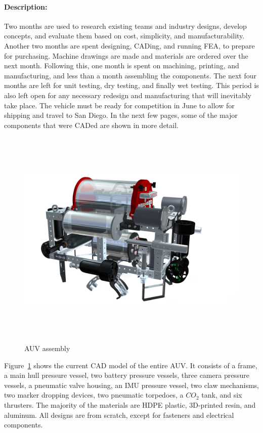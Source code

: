 \documentclass[12pt, landscape]{article}
\begin{document}
		\paragraph{Description:} Two months are used to research existing teams and industry designs, develop concepts, and evaluate them based on cost, simplicity, and manufacturability.  Another two months are spent designing, CADing, and running FEA, to prepare for purchasing.  Machine drawings are made and materials are ordered over the next month.  Following this, one month is spent on machining, printing, and manufacturing, and less than a month assembling the components.  The next four months are left for unit testing, dry testing, and finally wet testing.  This period is also left open for any necessary redesign and manufacturing that will inevitably take place.  The vehicle must be ready for competition in June to allow for shipping and travel to San Diego.
		In the next few pages, some of the major components that were CADed are shown in more detail.

	\begin{samepage}
		\begin{figure}[H]
			\centering
			\includegraphics[height=4.2in]{media/full_assembly.png}
			\caption{AUV assembly}
			\label{auv_assembly}
		\end{figure}

		Figure~\ref{auv_assembly} shows the current CAD model of the entire AUV. It consists of a frame, a main hull pressure vessel, two battery pressure vessels, three camera pressure vessels, a pneumatic valve housing, an IMU pressure vessel, two claw mechanisms, two marker dropping devices, two pneumatic torpedoes, a $CO_2$ tank, and six thrusters.  The majority of the materials are HDPE plastic, 3D-printed resin, and aluminum.  All designs are from scratch, except for fasteners and electrical components. 
	\end{samepage}
\end{document}
